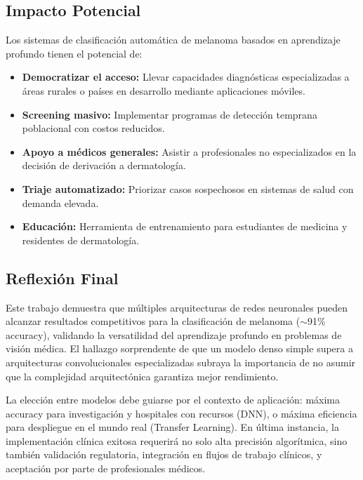 \documentclass[11pt, a4paper]{article}
\begin{document}
\subsection{Impacto Potencial}

Los sistemas de clasificación automática de melanoma basados en aprendizaje profundo tienen el potencial de:

\begin{itemize}
    \item \textbf{Democratizar el acceso:} Llevar capacidades diagnósticas especializadas a áreas rurales o países en desarrollo mediante aplicaciones móviles.
    
    \item \textbf{Screening masivo:} Implementar programas de detección temprana poblacional con costos reducidos.
    
    \item \textbf{Apoyo a médicos generales:} Asistir a profesionales no especializados en la decisión de derivación a dermatología.
    
    \item \textbf{Triaje automatizado:} Priorizar casos sospechosos en sistemas de salud con demanda elevada.
    
    \item \textbf{Educación:} Herramienta de entrenamiento para estudiantes de medicina y residentes de dermatología.
\end{itemize}

\subsection{Reflexión Final}

Este trabajo demuestra que múltiples arquitecturas de redes neuronales pueden alcanzar resultados competitivos para la clasificación de melanoma ($\sim$91\% accuracy), validando la versatilidad del aprendizaje profundo en problemas de visión médica. El hallazgo sorprendente de que un modelo denso simple supera a arquitecturas convolucionales especializadas subraya la importancia de no asumir que la complejidad arquitectónica garantiza mejor rendimiento.

La elección entre modelos debe guiarse por el contexto de aplicación: máxima accuracy para investigación y hospitales con recursos (DNN), o máxima eficiencia para despliegue en el mundo real (Transfer Learning). En última instancia, la implementación clínica exitosa requerirá no solo alta precisión algorítmica, sino también validación regulatoria, integración en flujos de trabajo clínicos, y aceptación por parte de profesionales médicos.
\end{document}
